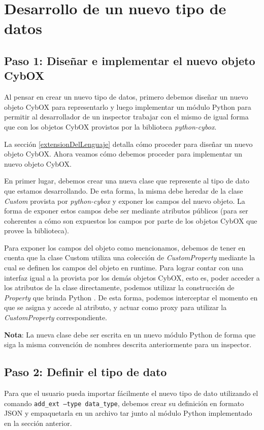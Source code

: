 \section{Desarrollo de un nuevo tipo de datos}
\label{nuevoTipoDeDatos}
\subsection*{Paso 1: Diseñar e implementar el nuevo objeto CybOX}
Al pensar en crear un nuevo tipo de datos, primero debemos diseñar un nuevo objeto CybOX para representarlo y luego implementar un módulo Python para permitir al desarrollador de un inspector trabajar con el mismo de igual forma que con los objetos CybOX provistos por la biblioteca \emph{python-cybox}.

La sección \ref{extensionDelLenguaje} detalla cómo proceder para diseñar un nuevo objeto CybOX. Ahora veamos cómo debemos proceder para implementar un nuevo objeto CybOX.

En primer lugar, debemos crear una nueva clase que represente al tipo de dato que estamos desarrollando. De esta forma, la misma debe heredar de la clase \emph{Custom} provista por \emph{python-cybox} y exponer los campos del nuevo objeto. La forma de exponer estos campos debe ser mediante atributos públicos (para ser coherentes a cómo son expuestos los campos por parte de los objetos CybOX que provee la biblioteca).

Para exponer los campos del objeto como mencionamos, debemos de tener en cuenta que la clase Custom utiliza una colección de \emph{CustomProperty} mediante la cual se definen los campos del objeto en runtime. Para lograr contar con una interfaz igual a la provista por los demás objetos CybOX, esto es, poder acceder a los atributos de la clase directamente, podemos utilizar la construcción de \emph{Property} que brinda Python \cite{python-property-class}. De esta forma, podemos interceptar el momento en que se asigna y accede al atributo, y actuar como proxy para utilizar la \emph{CustomProperty} correspondiente.

\textbf{Nota}: La nueva clase debe ser escrita en un nuevo módulo Python de forma que siga la misma convención de nombres descrita anteriormente para un inspector.

\subsection*{Paso 2: Definir el tipo de dato}
Para que el usuario pueda importar fácilmente el nuevo tipo de dato utilizando el comando \texttt{add\_ext ---type data\_type}, debemos crear su definición en formato JSON y empaquetarla en un archivo tar junto al módulo Python implementado en la sección anterior.


